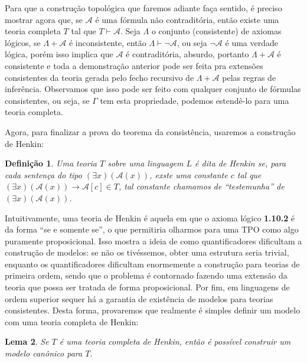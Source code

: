 \documentclass[11pt,a4paper]{article}
\newtheorem{mydef}{Definição}[section]
\newtheorem{lem}[mydef]{Lema}
\theoremstyle{definition}
\begin{document}
Para que a construção topológica que faremos adiante faça sentido, é preciso mostrar agora que, se $\mathscr{A}$ é uma fórmula não contraditória, então existe uma teoria completa $T$ tal que $T\vdash \mathscr{A}$. Seja $\Lambda$ o conjunto (consistente) de axiomas lógicos, se $\Lambda+\mathscr{A}$ é inconsistente, então $\Lambda\vdash \neg\mathscr{A}$, ou seja $\neg\mathscr{A}$ é uma verdade lógica, porém isso implica que  $\mathscr{A}$ é contraditória, absurdo, portanto $\Lambda+\mathscr{A}$ é consistente e toda a demonstração anterior pode ser feita pra extensões consistentes da teoria gerada pelo fecho recursivo de $\Lambda+\mathscr{A}$ pelas regras de inferência. Observamos que isso pode ser feito com qualquer conjunto de fórmulas consistentes, ou seja, se $\Gamma$ tem esta propriedade, podemos estendê-lo para uma teoria completa.

Agora, para finalizar a prova do teorema da consistência, usaremos a construção de Henkin: 

\begin{mydef}
	
	Uma teoria $T$ sobre uma linguagem $L$ é dita de Henkin se, para cada sentença do tipo $(\exists x)(\mathscr{A}(x))$, exste uma constante $c$ tal que $(\exists x)(\mathscr{A}(x))\rightarrow \mathscr{A}[c] \in T$, tal constante chamamos de ``testemunha'' de  $(\exists x)(\mathscr{A}(x))$.
	
\end{mydef}

Intuitivamente, uma teoria de Henkin é aquela em que o axioma lógico \textbf{1.10.2} é da forma ``se e somente se'', o que permitiria olharmos para uma TPO como algo puramente proposicional. Isso mostra a ideia de como quantificadores dificultam a construção de modelos: se não os tivéssemos, obter uma estrutura seria trivial, enquanto os quantificadores dificultam enormemente a construção para teorias de primeira ordem, sendo que o problema é contornado fazendo uma extensão da teoria que possa ser tratada de forma proposicional. Por fim, em linguagens de ordem superior sequer há a garantia de existência de modelos para teorias consistentes. Desta forma, provaremos que realmente é simples definir um modelo com uma teoria completa de Henkin: 

\begin{lem}
	
	Se $T$ é uma teoria completa de Henkin, então é possível construir um modelo canônico para $T$.
	
\end{lem}
\end{document}

